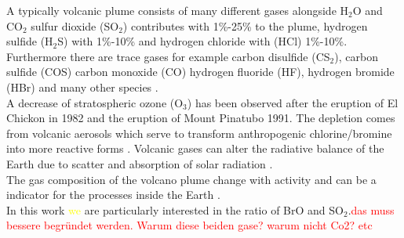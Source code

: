 A typically volcanic plume consists of many different gases alongside H$_2$O and CO$_2$  sulfur dioxide (SO$_2$) contributes with 1\%-25\% to the plume, hydrogen sulfide (H$_2$S) with 1\%-10\% and hydrogen chloride with (HCl) 1\%-10\%. Furthermore there are trace gases for example carbon disulfide (CS$_2$), carbon sulfide (COS) carbon monoxide (CO) hydrogen fluoride (HF), hydrogen bromide (HBr) and many other species \citet{platt2015quantification}.\\
%
A decrease of stratospheric ozone (O$_3$) has been observed after the eruption of  El Chickon in 1982 and the eruption of Mount Pinatubo 1991. The depletion comes from volcanic aerosols which serve to transform anthropogenic chlorine/bromine into more reactive forms \citet{solomon1998ozone}. 
%
Volcanic gases can alter the radiative balance of the Earth  due to scatter and absorption of solar radiation \citet{schmidt2015volcanism}.\\
%
The gas composition of the volcano plume change with activity and can be a indicator for the processes inside the Earth .\\ 
%
In this work \textcolor{yellow}{we} are particularly interested in the ratio of BrO and SO$_2$.\textcolor{red}{das muss bessere begründet werden. Warum diese beiden gase? warum nicht Co2? etc}
 
